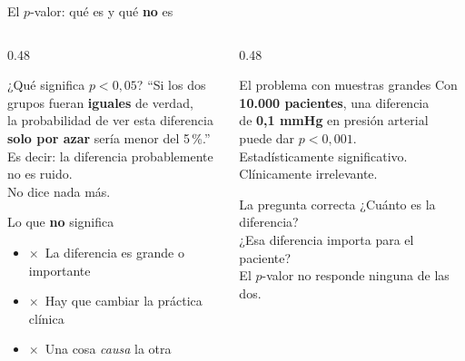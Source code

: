 \documentclass[aspectratio=169,10pt]{beamer}
\newcommand{\no}{\textcolor{UCred}{$\boldsymbol{\times}$}}
\begin{document}
\begin{frame}{El $p$-valor: qué es y qué \textbf{no} es}
  \begin{columns}[T]
    \begin{column}{0.48\textwidth}
      \vspace{2mm}
      \begin{block}{¿Qué significa $p < 0{,}05$?}
        \small ``Si los dos grupos fueran \textbf{iguales} de verdad,\\
        la probabilidad de ver esta diferencia\\
        \textbf{solo por azar} sería menor del 5\,\%.''\\[2mm]
        \scriptsize Es decir: la diferencia probablemente no es ruido.\\
        No dice nada más.
      \end{block}
      \vspace{4mm}
      \begin{block}{Lo que \textbf{no} significa}
        \begin{itemize}\small
          \item \no\ La diferencia es grande o importante
          \item \no\ Hay que cambiar la práctica clínica
          \item \no\ Una cosa \textit{causa} la otra
        \end{itemize}
      \end{block}
    \end{column}
    \begin{column}{0.48\textwidth}
      \vspace{2mm}
      \begin{exampleblock}{El problema con muestras grandes}
        \small Con \textbf{10.000 pacientes}, una diferencia\\
        de \textbf{0{,}1 mmHg} en presión arterial\\
        puede dar $p < 0{,}001$.\\[2mm]
        \scriptsize Estadísticamente significativo.\\
        Clínicamente irrelevante.
      \end{exampleblock}
      \vspace{4mm}
      \begin{block}{La pregunta correcta}
        \small ¿Cuánto es la diferencia?\\
        ¿Esa diferencia importa para el paciente?\\[1mm]
        \scriptsize El $p$-valor no responde ninguna de las dos.
      \end{block}
    \end{column}
  \end{columns}
\end{frame}
\end{document}
